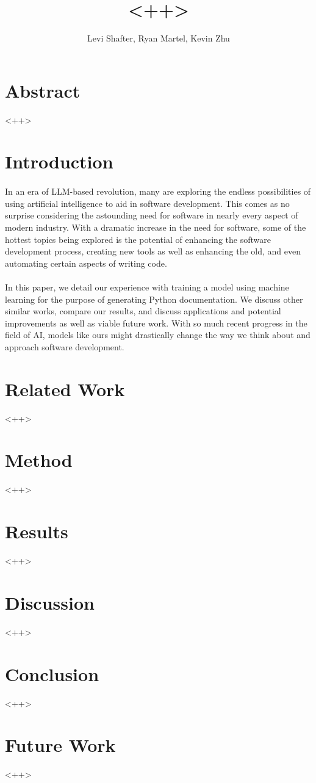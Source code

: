 \documentclass[12pt]{article}
\begin{document}
	\title{ <++> }
	\author{Levi Shafter, Ryan Martel, Kevin Zhu}
	\maketitle

	\section*{Abstract}
	<++>

	\section{Introduction}
	\paragraph{} In an era of LLM-based revolution, many are exploring the endless possibilities of using artificial intelligence to aid in software development. This comes as no surprise considering the astounding need for software in nearly every aspect of modern industry. With a dramatic increase in the need for software, some of the hottest topics being explored is the potential of enhancing the software development process, creating new tools as well as enhancing the old, and even automating certain aspects of writing code. 
	\paragraph{} In this paper, we detail our experience with training a model using machine learning for the purpose of generating Python documentation. We discuss other similar works, compare our results, and discuss applications and potential improvements as well as viable future work. With so much recent progress in the field of AI, models like ours might drastically change the way we think about and approach software development.

	\section{Related Work}
	<++>

	\section{Method}
	<++>

	\section{Results}
	<++>

	\section{Discussion}
	<++>

	\section{Conclusion}
	<++>

	\section{Future Work}
	<++>
\end{document}
